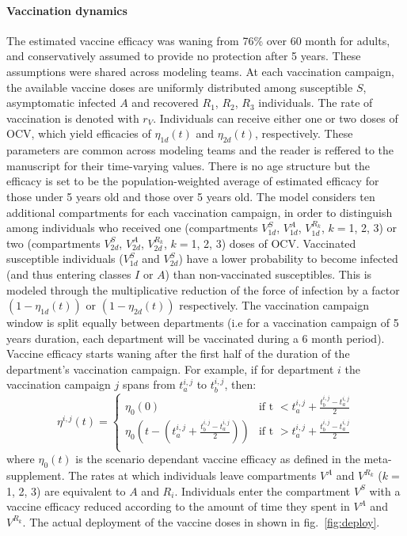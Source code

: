 \paragraph{Vaccination dynamics} The estimated vaccine efficacy was waning from 76\% over 60 month for adults, and conservatively assumed to provide no protection after 5 years. These assumptions were shared across modeling teams. 
At each vaccination campaign, the available vaccine doses are uniformly distributed among susceptible $S$, asymptomatic infected $A$ and recovered $R_{1}$, $R_2$, $R_3$ individuals. The rate of vaccination is denoted with $r_V$. Individuals can receive either one or two doses of OCV, which yield efficacies of $\eta_{1d}(t)$ and $\eta_{2d}(t)$, respectively. These parameters are common across modeling teams and the reader is reffered to the manuscript for their time-varying values. There is no age structure but the efficacy is set to be the population-weighted average of estimated efficacy for those under 5 years old and those over 5 years old.
 The model considers ten additional compartments for each vaccination campaign, in order to distinguish among individuals who received one (compartments $V^S_{1d}$, $V^A_{1d}$, $V^{R_k}_{1d}$, $k=$1, 2, 3) or two (compartments $V^S_{2d}$, $V^A_{2d}$, $V^{R_k}_{2d}$, $k=$1, 2, 3) doses of OCV. Vaccinated susceptible individuals ($V^S_{1d}$ and $V^S_{2d}$) have a lower probability to become infected (and thus entering classes $I$ or $A$) than non-vaccinated susceptibles. This is modeled through the multiplicative reduction of the force of infection by a  factor $(1-\eta_{1d}(t))$ or $(1-\eta_{2d}(t))$ respectively.
The vaccination campaign window is split equally between departments (i.e for a vaccination campaign of 5 years duration, each department will be vaccinated during a 6 month period). Vaccine efficacy starts waning after the first half of the duration of the department's vaccination campaign. For example, if for department $i$ the vaccination campaign $j$ spans from $t^{i,j}_a$ to $t^{i,j}_b$, then:
    \begin{equation}
\eta^{i,j}(t) = \left\{
    \begin{array}{ll}
        \eta_0(0) & \mbox{if t $<  t^{i,j}_a + \frac{t^{i,j}_b - t^{i,j}_a}{2}$} \\
        \eta_0(t -  (t^{i,j}_a +  \frac{t^{i,j}_b - t^{i,j}_a}{2}) ) & \mbox{if t $>  t^{i,j}_a + \frac{t^{i,j}_b - t^{i,j}_a}{2}$} \\
    \end{array}
\right.
\end{equation}
where $\eta_0(t)$ is the scenario dependant vaccine efficacy as defined in the meta-supplement.
The rates at which individuals leave compartments $V^A$ and $V^{R_k}$ ($k=$1, 2, 3) are equivalent to $A$ and $R_i$. Individuals enter the compartment $V^S$ with a vaccine efficacy reduced according to the amount of time they spent in $V^A$ and $V^{R_k}$. The actual deployment of the vaccine doses in shown in fig.~\ref{fig:deploy}.

